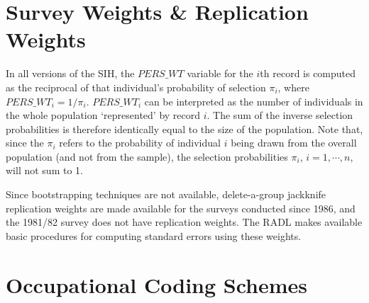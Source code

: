 \section{Survey Weights \& Replication Weights}

In all versions of the SIH, the $PERS\_WT$ variable for the $i$th record is computed as the reciprocal of that individual's probability of selection $\pi_i$, where $PERS\_WT_i = 1/\pi_i.$ $PERS\_WT_i$ can be interpreted as the number of individuals in the whole population `represented' by record $i$. The sum of the inverse selection probabilities is therefore identically equal to the size of the population. Note that, since the $\pi_i$ refers to the probability of individual $i$ being drawn from the overall population (and not from the sample), the selection probabilities $\pi_i$, $i=1,\cdots,n$, will not sum to 1.

Since bootstrapping techniques are not available, delete-a-group jackknife replication weights are made available for the surveys conducted since 1986, and the 1981/82 survey does not have replication weights. The RADL makes available basic procedures for computing standard errors using these weights.

\section{Occupational Coding Schemes}
\label{sec:occcoding}

